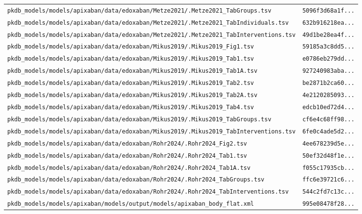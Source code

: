 \begin{longtable}{ll}
\texttt{pkdb\_models/models/apixaban/data/edoxaban/Metze2021/.Metze2021\_TabGroups.tsv} & \texttt{5096f3d68a1f...} \\
\texttt{pkdb\_models/models/apixaban/data/edoxaban/Metze2021/.Metze2021\_TabIndividuals.tsv} & \texttt{632b916218ea...} \\
\texttt{pkdb\_models/models/apixaban/data/edoxaban/Metze2021/.Metze2021\_TabInterventions.tsv} & \texttt{49d1be28ea4f...} \\
\texttt{pkdb\_models/models/apixaban/data/edoxaban/Mikus2019/.Mikus2019\_Fig1.tsv} & \texttt{59185a3c8dd5...} \\
\texttt{pkdb\_models/models/apixaban/data/edoxaban/Mikus2019/.Mikus2019\_Tab1.tsv} & \texttt{e0786eb279dd...} \\
\texttt{pkdb\_models/models/apixaban/data/edoxaban/Mikus2019/.Mikus2019\_Tab1A.tsv} & \texttt{927240983aba...} \\
\texttt{pkdb\_models/models/apixaban/data/edoxaban/Mikus2019/.Mikus2019\_Tab2.tsv} & \texttt{be2871b2ca60...} \\
\texttt{pkdb\_models/models/apixaban/data/edoxaban/Mikus2019/.Mikus2019\_Tab2A.tsv} & \texttt{4e2120285093...} \\
\texttt{pkdb\_models/models/apixaban/data/edoxaban/Mikus2019/.Mikus2019\_Tab4.tsv} & \texttt{edcb10ed72d4...} \\
\texttt{pkdb\_models/models/apixaban/data/edoxaban/Mikus2019/.Mikus2019\_TabGroups.tsv} & \texttt{cf6e4c68ff98...} \\
\texttt{pkdb\_models/models/apixaban/data/edoxaban/Mikus2019/.Mikus2019\_TabInterventions.tsv} & \texttt{6fe0c4ade5d2...} \\
\texttt{pkdb\_models/models/apixaban/data/edoxaban/Rohr2024/.Rohr2024\_Fig2.tsv} & \texttt{4ee678239d5e...} \\
\texttt{pkdb\_models/models/apixaban/data/edoxaban/Rohr2024/.Rohr2024\_Tab1.tsv} & \texttt{50ef32d48f1e...} \\
\texttt{pkdb\_models/models/apixaban/data/edoxaban/Rohr2024/.Rohr2024\_Tab1A.tsv} & \texttt{f055c17935cb...} \\
\texttt{pkdb\_models/models/apixaban/data/edoxaban/Rohr2024/.Rohr2024\_TabGroups.tsv} & \texttt{ffc6e39721c6...} \\
\texttt{pkdb\_models/models/apixaban/data/edoxaban/Rohr2024/.Rohr2024\_TabInterventions.tsv} & \texttt{544c2fd7c13c...} \\
\texttt{pkdb\_models/models/apixaban/models/output/models/apixaban\_body\_flat.xml} & \texttt{995e08478f28...} \\
\end{longtable}

